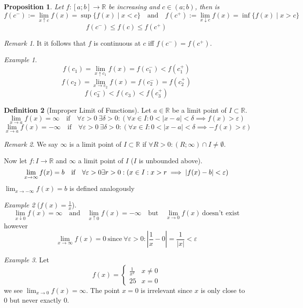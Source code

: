 \documentclass[english,titlepage]{uzhpub}
\theoremstyle{definition}
\newtheorem{definition}{Definition}[section]
\theoremstyle{plain}
\newtheorem{proposition}[definition]{Proposition}
\theoremstyle{remark}
\newtheorem*{remark}{Remark}
\theoremstyle{example}
\newtheorem*{example}{Example}
\begin{document}
   \begin{proposition}\label{pro:one_sided_lim_incr}
      Let \(f: [a; b] \to \mathbb{R}\) be increasing and \(c \in (a; b)\), then is
      \[f(c^-) := \lim_{x \uparrow c} f(x) = \sup\{f(x) \mid x < c\} \quad\text{and}\quad f(c^+) := \lim_{x \downarrow c} f(x) = \inf\{f(x) \mid x > c\}\]
      \[f(c^-) \leq f(c) \leq f(c^+)\]
   \end{proposition}
   \begin{remark}
      It it follows that \(f\) is continuous at \(c\) iff \(f(c^-) = f(c^+)\).
   \end{remark}

   \begin{center}
      
   \end{center}
   \begin{example}
      \[f(c_1) = \lim_{x \uparrow c_1} f(x) = f(c_1^-) < f(c_1^+)\]
      \[f(c_2) = \lim_{x \to c_2} f(x) = f(c_2^-) = f(c_2^+)\]
      \[f(c_3^-) < f(c_3) < f(c_3^+)\]
   \end{example}

   \begin{definition}[Improper Limit of Functions]
      Let \(a \in \mathbb{R}\) be a limit point of \(I \subset \mathbb{R}\).
      \[\lim_{x \to a} f(x) = \infty \quad\text{if}\quad \forall \varepsilon > 0~\exists \delta > 0: (\forall x \in I: 0 < |x - a| < \delta \implies f(x) > \varepsilon)\]
      \[\lim_{x \to a} f(x) = -\infty \quad\text{if}\quad \forall \varepsilon > 0~\exists \delta > 0: (\forall x \in I: 0 < |x - a| < \delta \implies -f(x) > \varepsilon)\]
   \end{definition}
   \begin{remark}
      We say \(\infty\) is a limit point of \(I \subset \mathbb{R}\) if \(\forall R > 0: (R; \infty) \cap I \neq \emptyset\).

      Now let \(f: I \to \mathbb{R}\) and \(\infty\) a limit point of \(I\) (\(I\) is unbounded above).
      \[\lim_{x \to \infty} f(x) = b \quad\text{if\quad} \forall \varepsilon > 0 \exists r > 0: (x \in I: x > r \implies |f(x) - b| < \varepsilon)\]
      \(\lim_{x \to -\infty} f(x) = b\) is defined analogously
   \end{remark}
   \begin{example}[\(f(x) = \frac{1}{x}\)]
      \[\lim_{x \downarrow 0} f(x) = \infty \quad\text{and}\quad \lim_{x \uparrow 0} f(x) = -\infty \quad\text{but}\quad \lim_{x \to 0} f(x)~\text{doesn't exist}\]
      however
      \[\lim_{x \to \infty} f(x) = 0~\text{since}~\forall \varepsilon > 0: |\frac{1}{x} - 0| = \frac{1}{|x|} < \varepsilon\]
   \end{example}
   \begin{example}
      Let
      \[f(x) = \begin{cases}\frac{1}{x^2} & x \neq 0\\ 25 & x=0\end{cases}\]
      we see \(\lim_{x \to 0} f(x) = \infty\).
      The point \(x = 0\) is irrelevant since \(x\) is only close to 0 but never exactly 0.
   \end{example}
\end{document}
